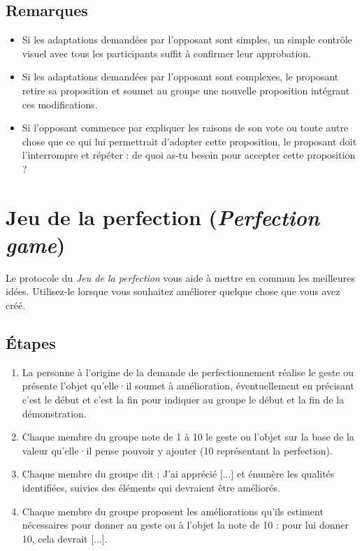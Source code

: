 \documentclass[11pt]{book}
\let\oldsection\section
\renewcommand\section{\clearpage\oldsection}
\begin{document}
\subsection{Remarques}
\begin{itemize}
	\item Si les adaptations demandées par l'opposant sont simples, un simple contrôle visuel avec tous les participants suffit à confirmer leur approbation.
	\item Si les adaptations demandées par l'opposant sont complexes, le proposant retire sa proposition et soumet au groupe une nouvelle proposition intégrant
	      ces modifications.
	\item Si l'opposant commence par expliquer les raisons de son vote ou toute autre chose que ce qui lui permettrait d'adopter cette proposition, le proposant
	      doit l'interrompre et répéter : \og{}de quoi as-tu besoin pour accepter cette proposition ?\fg{}
\end{itemize}

\section{Jeu de la perfection (\emph{Perfection game})} \label{protocole-jeu-perfection}

Le protocole du \emph{Jeu de la perfection} vous aide à mettre en commun les meilleures idées. Utilisez-le lorsque vous souhaitez améliorer quelque chose que vous
avez créé.

\subsection{Étapes}
\begin{enumerate}
	\item La personne à l'origine de la demande de perfectionnement réalise le geste ou présente l'objet qu'elle·il soumet à amélioration, éventuellement en
	      précisant \og{}c'est le début\fg{} et \og{}c'est la fin\fg{} pour indiquer au groupe le début et la fin de la démonstration.
	\item Chaque membre du groupe note de 1 à 10 le geste ou l'objet sur la base de la valeur qu'elle·il pense pouvoir y ajouter (10 représentant la perfection).
	\item Chaque membre du groupe dit : \og{}J'ai apprécié [...]\fg{} et énumère les qualités identifiées, suivies des éléments qui devraient être améliorés.
	\item Chaque membre du groupe proposent les améliorations qu'ils estiment nécessaires pour donner au geste ou à l'objet la note de 10 : \og{}pour lui donner
	      10, cela devrait [...]\fg{}.
\end{enumerate}
\end{document}
